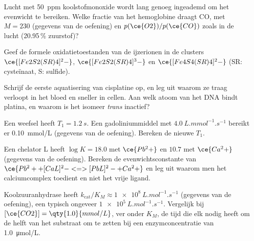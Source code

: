 \begin{exercise}[$\star\star$]\label{exo:b3:bioinorganic:6}
Lucht met \qty{50}{ppm} koolstofmonoxide wordt lang genoeg ingeademd om
het evenwicht te bereiken. Welke fractie van het hemoglobine draagt CO,
met $M = 230$ (gegevens van de oefening) en $p(\ce{O2})/p(\ce{CO})$ zoals in de lucht
(20.95\,\% zuurstof)?
\end{exercise}

\begin{exercise}[$\star\star$]\label{exo:b3:bioinorganic:7}
Geef de formele oxidatietoestanden van de ijzerionen in de clusters $\ce{[Fe2S2(SR)4]^2-}$,
$\ce{[Fe2S2(SR)4]^3-}$ en $\ce{[Fe4S4(SR)4]^2-}$ (SR: cysteïnaat, S: sulfide).
\end{exercise}

\begin{exercise}[$\star\star$]\label{exo:b3:bioinorganic:8}
Schrijf de eerste aquatisering van cisplatine op, en leg uit waarom ze
traag verloopt in het bloed en sneller in cellen. Aan welk atoom van het
DNA bindt platina, en waarom is het isomeer
\textit{trans} inactief?
\end{exercise}

\begin{exercise}[$\star\star$]\label{exo:b3:bioinorganic:9}
Een weefsel heeft $T_1 = \qty{1.2}{s}$. Een gadoliniummiddel met  $\qty{4.0}{L.mmol^{-1}.s^{-1}}$ bereikt er \qty{0.10}{mmol/L}
(gegevens van de oefening). Bereken de nieuwe $T_1$.
\end{exercise}

\begin{exercise}[$\star\star\star$]\label{exo:b3:bioinorganic:10}
Een chelator L heeft $\log K = 18.0$ met $\ce{Pb^2+}$ en $10.7$ met $\ce{Ca^2+}$ (gegevens van de oefening).
Bereken de evenwichtsconstante van $\ce{Pb^2+ + [CaL]^2- <=> [PbL]^2- + Ca^2+}$ en leg uit waarom men het
calciumcomplex toedient en niet het vrije ligand.
\end{exercise}

\begin{exercise}[$\star\star\star$]\label{exo:b3:bioinorganic:11}
Koolzuuranhydrase heeft $k_{\mathrm{cat}}/K_M \approx \qty{1e8}{L.mol^{-1}.s^{-1}}$ (gegevens van de oefening), een typisch  ongeveer
$\qty{1e5}{L.mol^{-1}.s^{-1}}$. Vergelijk bij $[\ce{CO2}] = \qty{1.0}{mmol/L}$, ver onder $K_M$, de tijd die elk nodig heeft om de helft
van het substraat om te zetten bij een enzymconcentratie van \qty{1.0}{\micro mol/L}.
\end{exercise}

